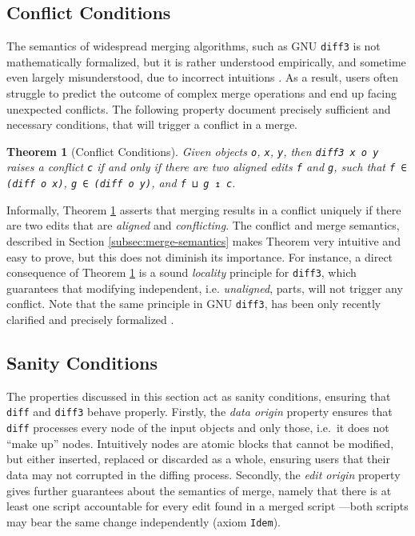 \documentclass{sigplanconf}
\theoremstyle{plain}
\newtheorem{thm}{Theorem}
\begin{document}
\subsection{Conflict Conditions}
The semantics of widespread merging algorithms, such as GNU
\texttt{diff3} is not mathematically formalized, but it is rather
understood empirically, and sometime even largely misunderstood, due
to incorrect intuitions \cite{PierceDiff3}.
%
As a result, users often struggle to predict the outcome of complex
merge operations and end up facing unexpected conflicts.
%
The following property document precisely sufficient and necessary
conditions, that will trigger a conflict in a merge.
%
\begin{thm}[Conflict Conditions]
\label{thm:conflict-conds}
  Given objects \texttt{o}, \texttt{x}, \texttt{y}, 
  then \texttt{diff3 x o y} raises a conflict \texttt{c} if and only if
  there are two aligned edits \texttt{f} and \texttt{g}, such that
  \texttt{f ∈ (diff o x)}, \texttt{g ∈ (diff o y)}, and \texttt{f ⊔ g ↥ c}.
\end{thm}
Informally, Theorem \ref{thm:conflict-conds} asserts that merging
results in a conflict uniquely if there are two edits that are
\emph{aligned} and \emph{conflicting}.
%
The conflict and merge semantics, described in Section
\ref{subsec:merge-semantics} makes Theorem very intuitive and easy to
prove, but this does not diminish its importance.
%
For instance, a direct consequence of Theorem \ref{thm:conflict-conds}
is a sound \emph{locality} principle for \texttt{diff3}, which
guarantees that modifying independent, i.e. \emph{unaligned}, parts,
will not trigger any conflict.
%
Note that the same principle in GNU \texttt{diff3}, has been only
recently clarified and precisely formalized \cite{PierceDiff3}.

\subsection{Sanity Conditions}
The properties discussed in this section act as sanity conditions,
ensuring that \texttt{diff} and \texttt{diff3} behave properly.
%
Firstly, the \emph{data origin} property ensures that \texttt{diff}
processes every node of the input objects and only those, i.e.\ it
does not ``make up'' nodes.
%
Intuitively nodes are atomic blocks that cannot be modified, but
either inserted, replaced or discarded as a whole, ensuring users that
their data may not corrupted in the diffing process.
%
Secondly, the \emph{edit origin} property gives further guarantees
about the semantics of merge, namely that there is at least one script
accountable for every edit found in a merged script ---both scripts
may bear the same change independently (axiom \texttt{Idem}).
%
%
\end{document}
